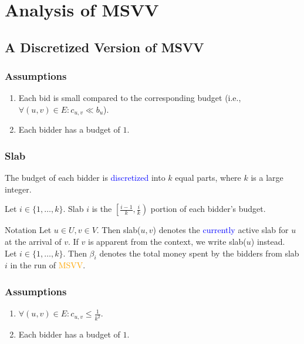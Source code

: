 \section{Analysis of MSVV}

\subsection{A Discretized Version of MSVV}

\begin{frame}
    \frametitle{Assumptions}
	\begin{enumerate}
        \item<1-> Each bid is small compared to the corresponding budget \mbox{(i.e., $\forall (u,v) \in E: c_{u,v} \ll b_u$}).
        \item<1-> Each bidder has a budget of $1$.
	\end{enumerate}
\end{frame}

\begin{frame}
    \frametitle{Slab}
    The budget of each bidder is \textcolor{blue}{discretized} into $k$ equal parts, where $k$ is a large integer.
    \begin{definition}
        Let $i \in \{1, \dots, k \}$. \alert{Slab} $i$ is the $\left[\frac{i-1}{k}, \frac{i}{k} \right)$ portion of each bidder's budget.
    \end{definition}
    \begin{block}{Notation}
        Let $u \in U, v \in V$. Then slab($u,v$) denotes the \textcolor{blue}{currently} active slab for $u$ at the arrival of $v$. If $v$ is apparent from the context, we write slab($u$) instead.\\
        \smallskip
        Let $i \in \{1, \dots, k \}$. Then $\beta_i$ denotes the total money spent by the bidders from slab $i$ in the run of \textcolor{orange}{MSVV}.
    \end{block}
\end{frame}

\begin{frame}
    \frametitle{Assumptions}
	\begin{enumerate}
        \item<1-> $\forall (u,v) \in E: c_{u,v} \leq \frac{1}{k^2}$.
        \item<1-> Each bidder has a budget of $1$.
	\end{enumerate}
\end{frame}

